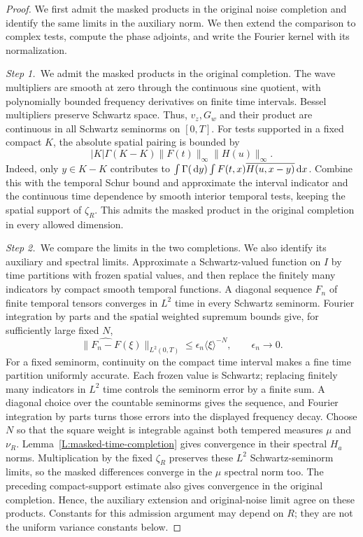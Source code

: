 \begin{proof}
  We first admit the masked products in the original noise completion and
  identify the same limits in the auxiliary norm. We then extend the
  comparison to complex tests, compute the phase adjoints, and write the
  Fourier kernel with its normalization.

  \medskip
  \noindent\textit{Step 1.~}We admit the masked products in the original
  completion.
  The wave multipliers are smooth at zero through the continuous sine quotient,
  with polynomially bounded frequency derivatives on finite time intervals.
  Bessel multipliers preserve Schwartz space. Thus, $v_z,G_w$ and their product
  are continuous in all Schwartz seminorms on $[0,T]$. For tests supported in a
  fixed compact $K$, the absolute spatial pairing is bounded by
  \[
    |K|\Gamma(K-K)\|F(t)\|_\infty\|H(u)\|_\infty.
  \]
  Indeed, only $y \in K-K$ contributes to $\int\Gamma(\,\mathrm{d} y)\int
  F(t,x)\overline{H(u,x-y)}\,\mathrm{d} x$. Combine this with the temporal Schur bound
  and approximate the interval indicator and the continuous time dependence by
  smooth interior temporal tests, keeping the spatial support of $\zeta_R$. This
  admits the masked product in the original completion in every allowed
  dimension.

  \medskip
  \noindent\textit{Step 2.~}We compare the limits in the two completions.
  We also identify its auxiliary and spectral limits. Approximate a
  Schwartz-valued function on $I$ by time partitions with frozen spatial values,
  and then replace the finitely many indicators by compact smooth temporal
  functions. A diagonal sequence $F_n$ of finite temporal tensors converges in
  $L^2$ time in every Schwartz seminorm. Fourier integration by parts and the
  spatial weighted supremum bounds give, for sufficiently large fixed $N$,
  \[
    \|\widehat{F_n-F}(\xi)\|_{L^2(0,T)}
    \le \epsilon_n\langle\xi\rangle^{-N},\qquad \epsilon_n \to 0.
  \]
  For a fixed seminorm, continuity on the compact time interval makes a fine
  time partition uniformly accurate. Each frozen value is Schwartz; replacing
  finitely many indicators in $L^2$ time controls the seminorm error by a
  finite sum. A diagonal choice over the countable seminorms gives the
  sequence, and Fourier integration by parts turns those errors into the
  displayed frequency decay.
  Choose $N$ so that the square weight is integrable against both tempered
  measures $\mu$ and $\nu_R$. Lemma~\ref{L:masked-time-completion} gives
  convergence in their spectral $H_a$ norms. Multiplication by the fixed
  $\zeta_R$ preserves these $L^2$ Schwartz-seminorm limits, so the masked
  differences converge in the $\mu$ spectral norm too. The preceding
  compact-support estimate also gives convergence in the original completion.
  Hence, the auxiliary extension and original-noise limit agree on these
  products. Constants for this admission argument may depend on $R$; they are
  not the uniform variance constants below.


\end{proof}

